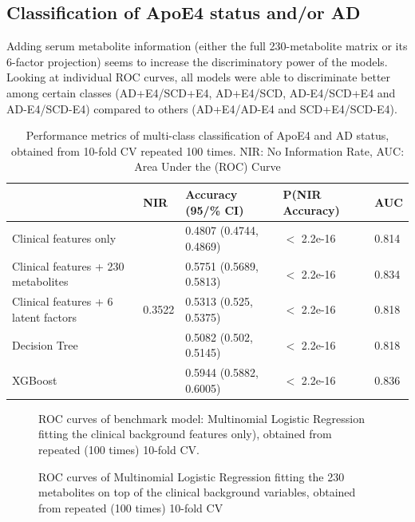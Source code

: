 \documentclass{amsart}
\begin{document}
\subsection{Classification of ApoE4 status and/or AD}
Adding serum metabolite information (either the full 230-metabolite matrix or its 6-factor projection) seems to increase the discriminatory power of the models.
Looking at individual ROC curves, all models were able to discriminate better among certain classes (AD+E4/SCD+E4, AD+E4/SCD, AD-E4/SCD+E4 and AD-E4/SCD-E4) compared to others (AD+E4/AD-E4 and SCD+E4/SCD-E4).
\begin{table}[H]
\caption{Performance metrics of multi-class classification of ApoE4 and AD status, obtained from 10-fold CV repeated 100 times. NIR: No Information Rate, AUC: Area Under the (ROC) Curve}
\label{tab:class_results}
\begin{tabular}{lllll} \toprule
                                     & NIR & Accuracy (95/\% CI)     & P(NIR  Accuracy) & AUC   \\ \midrule
Clinical features only & \multirow{5}{*}{0.3522} & 0.4807 (0.4744, 0.4869) & $<$ 2.2e-16 & 0.814 \\
Clinical features + 230 metabolites  &     & 0.5751 (0.5689, 0.5813) & $<$ 2.2e-16         & 0.834 \\
Clinical features + 6 latent factors &     & 0.5313 (0.525, 0.5375)  & $<$ 2.2e-16         & 0.818 \\
Decision Tree                        &     & 0.5082 (0.502, 0.5145)  & $<$ 2.2e-16         & 0.818 \\
XGBoost                              &     & 0.5944 (0.5882, 0.6005) & $<$ 2.2e-16         & 0.836 \\ \bottomrule
\end{tabular}
\end{table}

\begin{figure}[htb]
  
  \caption{ROC curves of benchmark model: Multinomial Logistic Regression fitting the clinical background features only), obtained from repeated (100 times) 10-fold CV.}
  \label{roc:bench}
\end{figure}

\begin{figure}
  
  \caption{ROC curves of Multinomial Logistic Regression fitting the 230 metabolites on top of the clinical background variables, obtained from repeated (100 times) 10-fold CV}
  \label{roc:full}
\end{figure}
\end{document}
